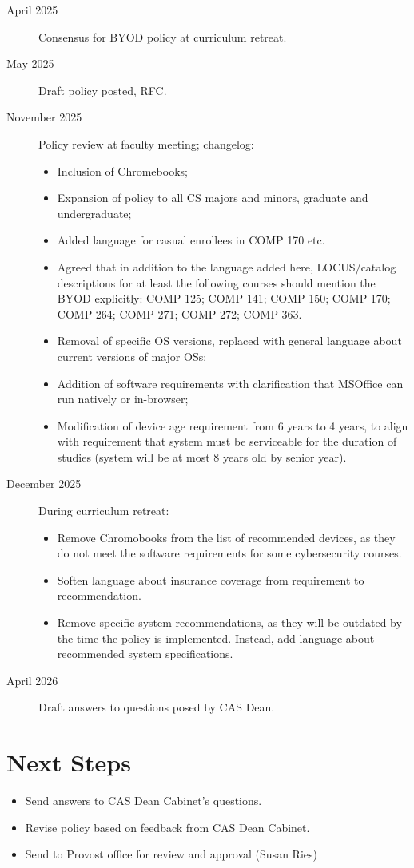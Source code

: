 \begin{description}

    \item[April 2025] Consensus for BYOD policy at curriculum retreat. 
    \item[May 2025] Draft policy posted, RFC.
    \item[November 2025] Policy review at faculty meeting; changelog:
    \begin{itemize}
    \item Inclusion of Chromebooks;
    \item Expansion of policy to all CS majors and minors, graduate and undergraduate;
    \item Added language for casual enrollees in COMP 170 etc. 
    \item Agreed that in addition to the language added here, LOCUS/catalog descriptions for at least the following courses should mention the BYOD explicitly: COMP 125; COMP 141; COMP 150; COMP 170; COMP 264; COMP 271; COMP 272; COMP 363.
    \item Removal of specific OS versions, replaced with general language about current versions of major OSs;
    \item Addition of software requirements with clarification that MSOffice can run natively or in-browser;
    \item Modification of device age requirement from 6 years to 4 years, to align with requirement that system must be serviceable for the duration of studies (system will be at most 8 years old by senior year).
    \end{itemize}
    \item[December 2025] During curriculum retreat:
    \begin{itemize}
        \item Remove Chromobooks from the list of recommended devices, as they do not meet the software requirements for some cybersecurity courses.
        \item Soften language about insurance coverage from requirement to recommendation.
        \item Remove specific system recommendations, as they will be outdated by the time the policy is implemented. Instead, add language about recommended system specifications.
    \end{itemize}
    \item[April 2026] Draft answers to questions posed by CAS Dean.
    
    \end{description}


\newpage

\section*{Next Steps}

\begin{itemize}
    \item Send answers to CAS Dean Cabinet's questions.
    \item Revise policy based on feedback from CAS Dean Cabinet.
    \item Send to Provost office for review and approval (Susan Ries)
\end{itemize}

